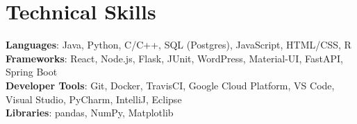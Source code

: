 \documentclass[letterpaper,11pt]{article}
\begin{document}
\section{Technical Skills}
\begin{itemize}[leftmargin=0.15in, label={}]
\small{\item{\textbf{Languages}{: Java, Python, C/C++, SQL (Postgres), JavaScript, HTML/CSS, R} \\
\textbf{Frameworks}{: React, Node.js, Flask, JUnit, WordPress, Material-UI, FastAPI, Spring Boot} \\
\textbf{Developer Tools}{: Git, Docker, TravisCI, Google Cloud Platform, VS Code, Visual Studio, PyCharm, IntelliJ, Eclipse} \\
\textbf{Libraries}{: pandas, NumPy, Matplotlib}}}
\end{itemize}


\end{document}
